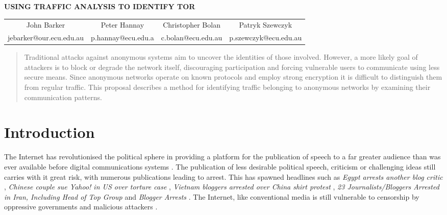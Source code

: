\documentclass{conference}
\begin{document}
{\center \Large \bfseries \MakeUppercase{Using traffic analysis to identify Tor} \par}

{ \center
  \begin{tabular*}{\textwidth}{cccc}
  John Barker & Peter Hannay & Christopher Bolan & Patryk Szewczyk \\
  jebarker@our.ecu.edu.au & p.hannay@ecu.edu.a & c.bolan@ecu.edu.au & p.szewczyk@ecu.edu.au \\
  \end{tabular*}
}

\begin{abstract}

Traditional attacks against anonymous systems aim to uncover the identities of those involved. However, a more likely goal of attackers is to block or degrade the network itself, discouraging participation and forcing vulnerable users to communicate using less secure means. Since anonymous networks operate on known protocols and employ strong encryption it is difficult to distinguish them from regular traffic. This proposal describes a method for identifying traffic belonging to anonymous networks by examining their communication patterns.

\end{abstract}

\section{Introduction}

The Internet has revolutionised the political sphere in providing a platform for the publication of speech to a far greater audience than was ever available before digital communications systems \parencite{Bonchek:1997p3455}. The publication of less desirable political speech, criticism or challenging ideas still carries with it great risk, with numerous publications leading to arrest. This has spawned headlines such as \emph{Egypt arrests another blog critic} \citeyear{website:egypt-arrests}, \emph{Chinese couple sue Yahoo! in US over torture case} \parencite{website:china-yahoo-torture}, \emph{Vietnam bloggers arrested over China shirt protest} \parencite{website:vietnam-bloggers-arrested}, \emph{23 Journalists/Bloggers Arrested in Iran, Including Head of Top Group} \citeyear{website:iran-bloggers-arrested} and \emph{Blogger Arrests} \parencite{website:blogger-arrests}. The Internet, like conventional media is still vulnerable to censorship by oppressive governments and malicious attackers \parencite{Crandall:2007p6165,Karlin:2009p6166}.
\end{document}
